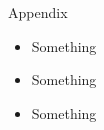\begin{frame}{Appendix}
	\begin{itemize}
		\item Something
		\item Something
		\item Something
	\end{itemize}

\end{frame}
